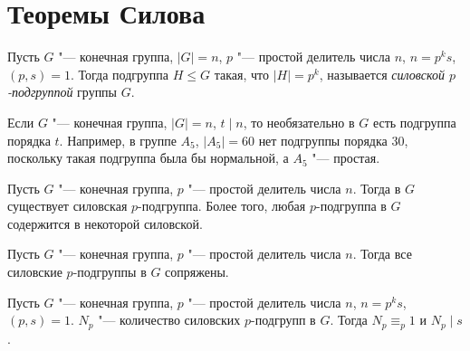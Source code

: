 \section{Теоремы Силова}

\begin{definition}
	Пусть $G$ "--- конечная группа, $|G| = n$, $p$ "--- простой делитель числа $n$, $n = p^ks$, $(p, s) = 1$. Тогда подгруппа $H \le G$ такая, что $|H| = p^k$, называется \textit{силовской $p$-подгруппой} группы $G$.
\end{definition}

\begin{note}
	Если $G$ "--- конечная группа, $|G| = n$, $t \mid n$, то необязательно в $G$ есть подгруппа порядка $t$. Например, в группе $A_5$, $|A_5| = 60$ нет подгруппы порядка 30, поскольку такая подгруппа была бы нормальной, а $A_5$ "--- простая.
\end{note}

\begin{theorem}
	Пусть $G$ "--- конечная группа, $p$ "--- простой делитель числа $n$. Тогда в $G$ существует силовская $p$-подгруппа. Более того, любая $p$-подгруппа в $G$ содержится в некоторой силовской.
\end{theorem}

\begin{theorem}
	Пусть $G$ "--- конечная группа, $p$ "--- простой делитель числа $n$. Тогда все силовские $p$-подгруппы в $G$ сопряжены.
\end{theorem}

\begin{theorem}
	Пусть $G$ "--- конечная группа, $p$ "--- простой делитель числа $n$, $n = p^ks$, $(p, s) = 1$. $N_p$ "--- количество силовских $p$-подгрупп в $G$. Тогда $N_p \equiv_p 1$ и $N_p \mid s$.
\end{theorem}